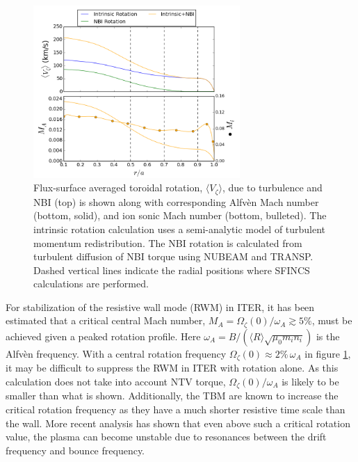 \documentclass[aip, pop, preprint]{revtex4-1}
\numberwithin{figure}{section}
\numberwithin{equation}{section}
\begin{document}
\FloatBarrier

\begin{figure}[h!]
\centering
\includegraphics[width=0.7\textwidth]{rotationestimate.png}
\caption{\label{fig:rotation_estimate} Flux-surface averaged toroidal rotation, $\langle V_{\zeta} \rangle$, due to turbulence and NBI (top) is shown along with  corresponding Alfv\`{e}n Mach number (bottom, solid), and ion sonic Mach number (bottom, bulleted). The intrinsic rotation calculation uses a semi-analytic model of turbulent momentum redistribution.\cite{Hillesheim2015} The NBI rotation is calculated from turbulent diffusion of NBI torque using NUBEAM and TRANSP.\cite{Poli2014} Dashed vertical lines indicate the radial positions where SFINCS calculations are performed. }
\end{figure}

For stabilization of the resistive wall mode (RWM) in ITER, it has been estimated\cite{Liu2004} that a critical central Mach number, $M_A = \Omega_{\zeta}(0)/\omega_A \gtrsim 5\%$, must be achieved given a peaked rotation profile. Here $\omega_A = B/(\langle R\rangle\sqrt{\mu_0 m_i n_i})$ is the Alfv\`{e}n frequency. With a central rotation frequency $\Omega_{\zeta}(0) \approx 2\% \, \omega_A$ in figure \ref{fig:rotation_estimate}, it may be difficult to suppress the RWM in ITER with rotation alone. As this calculation does not take into account NTV torque, $\Omega_{\zeta}(0)/\omega_A$ is likely to be smaller than what is shown. Additionally, the TBM are known to increase the critical rotation frequency as they have a much shorter resistive time scale than the wall.\cite{Liu2004} More recent analysis has shown that even above such a critical rotation value, the plasma can become unstable due to resonances between the drift frequency and bounce frequency.\cite{Berkery2010, Liu2009}
\end{document}
